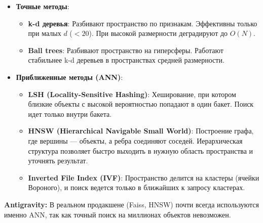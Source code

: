 \documentclass[12pt]{article}
\newcommand{\antigravity}[1]{{\small\color{antigravityblue}\textbf{Antigravity:} #1}}
\begin{document}
\begin{itemize}
    \item \textbf{Точные методы}:
    \begin{itemize}
        \item \textbf{k-d деревья}: Разбивают пространство по признакам. Эффективны только при малых $d$ ($< 20$). При высокой размерности деградируют до $O(N)$.
        \item \textbf{Ball trees}: Разбивают пространство на гиперсферы. Работают стабильнее k-d деревьев в пространствах средней размерности.
    \end{itemize}
    \item \textbf{Приближенные методы (ANN)}:
    \begin{itemize}
        \item \textbf{LSH (Locality-Sensitive Hashing)}: Хеширование, при котором близкие объекты с высокой вероятностью попадают в один бакет. Поиск идет только внутри бакета.
        \item \textbf{HNSW (Hierarchical Navigable Small World)}: Построение графа, где вершины — объекты, а ребра соединяют соседей. Иерархическая структура позволяет быстро выходить в нужную область пространства и уточнять результат.
        \item \textbf{Inverted File Index (IVF)}: Пространство делится на кластеры (ячейки Вороного), и поиск ведется только в ближайших к запросу кластерах.
    \end{itemize}
\end{itemize}

\antigravity{В реальном продакшене (Faiss, HNSW) почти всегда используются именно ANN, так как точный поиск на миллионах объектов невозможен.}
\end{document}
